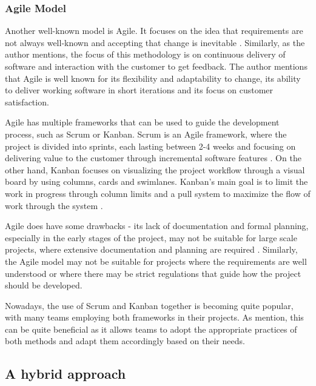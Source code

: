 
\subsubsection{Agile Model}

Another well-known model is Agile. It focuses on the idea that requirements are not always well-known and accepting that change is inevitable \parencite{agile}. Similarly, as the author mentions, the focus of this methodology is on continuous delivery of software and interaction with the customer to get feedback. The author mentions that Agile is well known for its flexibility and adaptability to change, its ability to deliver working software in short iterations and its focus on customer satisfaction.

Agile has multiple frameworks that can be used to guide the development process, such as Scrum or Kanban. Scrum is an Agile framework, where the project is divided into sprints, each lasting between 2-4 weeks and focusing on delivering value to the customer through incremental software features \parencite{scrumban, agile}. On the other hand, Kanban focuses on visualizing the project workflow through a visual board by using columns, cards and swimlanes. Kanban's main goal is to limit the work in progress through column limits and a pull system to maximize the flow of work through the system \parencite{agile}.

Agile does have some drawbacks - its lack of documentation and formal planning, especially in the early stages of the project, may not be suitable for large scale projects, where extensive documentation and planning are required \parencite{sdlc1, agile, sdlc2}. Similarly, the Agile model may not be suitable for projects where the requirements are well understood or where there may be strict regulations that guide how the project should be developed.

Nowadays, the use of Scrum and Kanban together is becoming quite popular, with many teams employing both frameworks in their projects. As \textcite{scrumban} mention, this can be quite beneficial as it allows teams to adopt the appropriate practices of both methods and adapt them accordingly based on their needs.


\subsection{A hybrid approach}

